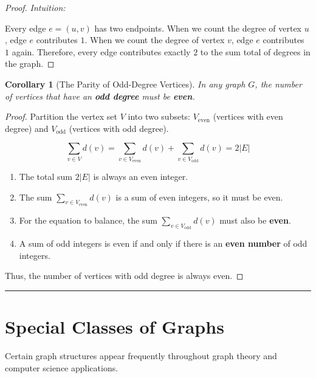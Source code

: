 \documentclass[
]{book}
\providecommand{\tightlist}{%
  \setlength{\itemsep}{0pt}\setlength{\parskip}{0pt}}
\newtheorem{corollary}{Corollary}[chapter]
\theoremstyle{definition}
\theoremstyle{definition}
\theoremstyle{definition}
\theoremstyle{definition}
\theoremstyle{remark}
\begin{document}
\begin{proof}
\emph{Intuition:}

Every edge \(e = (u, v)\) has two endpoints. When we count the degree of vertex \(u\), edge \(e\) contributes \(1\). When we count the degree of vertex \(v\), edge \(e\) contributes \(1\) again. Therefore, every edge contributes exactly \(2\) to the sum total of degrees in the graph.
\end{proof}

\begin{corollary}[The Parity of Odd-Degree Vertices]
\protect\hypertarget{cor:unnamed-chunk-5}{}\label{cor:unnamed-chunk-5}In any graph \(G\), the number of vertices that have an \textbf{odd degree} must be \textbf{even}.
\end{corollary}

\begin{proof}
Partition the vertex set \(V\) into two subsets: \(V_{\text{even}}\) (vertices with even degree) and \(V_{\text{odd}}\) (vertices with odd degree).

\[\sum_{v \in V} d(v) = \sum_{v \in V_{\text{even}}} d(v) + \sum_{v \in V_{\text{odd}}} d(v) = 2\vert{}E\vert{}\]

\begin{enumerate}
\def\labelenumi{\arabic{enumi}.}
\tightlist
\item
  The total sum \(2\vert{}E\vert{}\) is always an even integer.
\item
  The sum \(\sum_{v \in V_{\text{even}}} d(v)\) is a sum of even integers, so it must be even.
\item
  For the equation to balance, the sum \(\sum_{v \in V_{\text{odd}}} d(v)\) must also be \textbf{even}.
\item
  A sum of odd integers is even if and only if there is an \textbf{even number} of odd integers.
\end{enumerate}

Thus, the number of vertices with odd degree is always even.
\end{proof}

\begin{center}\rule{0.5\linewidth}{0.5pt}\end{center}

\section{Special Classes of Graphs}\label{special-classes-of-graphs}

Certain graph structures appear frequently throughout graph theory and computer science applications.
\end{document}

